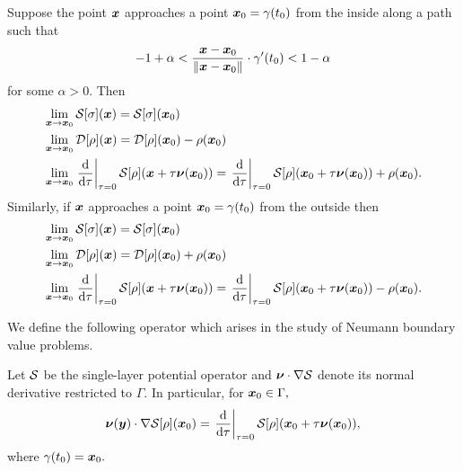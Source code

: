 \begin{theorem}\label{thm:potlim}
Suppose the point $\boldsymbol{x}$ approaches a point $\boldsymbol{x}_0 = \gamma(t_0)$ from the inside along a path such that 
\begin{align}
-1+\alpha<\frac{\boldsymbol{x}-\boldsymbol{x}_0}{\|\boldsymbol{x}-\boldsymbol{x}_0\|} \cdot \gamma'(t_0) <1-\alpha
\end{align}
for some $\alpha >0.$ Then 
\begin{align}
&\lim_{\boldsymbol{x} \to \boldsymbol{x}_0} \mathcal{S}[\sigma](\boldsymbol{x}) = \mathcal{S}[\sigma](\boldsymbol{x}_0)\\
&\lim_{\boldsymbol{x} \to \boldsymbol{x}_0} \mathcal{D}[\rho](\boldsymbol{x}) = \mathcal{D}[\rho](\boldsymbol{x}_0)- \rho(\boldsymbol{x}_0)\\
&\lim_{\boldsymbol{x} \to \boldsymbol{x}_0} \left.\frac{{\rm d}}{{\rm d}\tau}\right|_{\tau= 0}\mathcal{S}[\rho](\boldsymbol{x}+\tau \boldsymbol{\nu}(\boldsymbol{x}_0)) = \left.\frac{{\rm d}}{{\rm d}\tau}\right|_{\tau= 0}\mathcal{S}[\rho](\boldsymbol{x}_0+\tau \boldsymbol{\nu}(\boldsymbol{x}_0))+ \rho(\boldsymbol{x}_0).
\end{align}
Similarly, if $\boldsymbol{x}$ approaches a point $\boldsymbol{x}_0 = \gamma(t_0)$ from the outside then
\begin{align}
&\lim_{\boldsymbol{x} \to \boldsymbol{x}_0} \mathcal{S}[\sigma](\boldsymbol{x}) = \mathcal{S}[\sigma](\boldsymbol{x}_0)\\
&\lim_{\boldsymbol{x} \to \boldsymbol{x}_0} \mathcal{D}[\rho](\boldsymbol{x}) = \mathcal{D}[\rho](\boldsymbol{x}_0)+ \rho(\boldsymbol{x}_0)\\
&\lim_{\boldsymbol{x} \to \boldsymbol{x}_0} \left.\frac{{\rm d}}{{\rm d}\tau}\right|_{\tau= 0}\mathcal{S}[\rho](\boldsymbol{x}+\tau \boldsymbol{\nu}(\boldsymbol{x}_0)) = \left.\frac{{\rm d}}{{\rm d}\tau}\right|_{\tau= 0}\mathcal{S}[\rho](\boldsymbol{x}_0+\tau \boldsymbol{\nu}(\boldsymbol{x}_0))- \rho(\boldsymbol{x}_0).
\end{align}
\end{theorem}

We define the following operator which arises in the study of Neumann boundary value problems.
\begin{definition}\label{def_singder}
Let $\mathcal{S}$ be the single-layer potential operator and $\boldsymbol{\nu}\cdot \nabla \mathcal{S}$  denote its normal derivative restricted to $\Gamma.$ In particular, for $\boldsymbol{x}_0 \in \Gamma,$
\begin{align}
\boldsymbol{\nu}(\boldsymbol{y})\cdot \nabla \mathcal{S}[\rho] (\boldsymbol{x}_0) = \left.\frac{{\rm d}}{{\rm d}\tau}\right|_{\tau = 0} \mathcal{S}[\rho](\boldsymbol{x}_0 + \tau \boldsymbol{\nu}(\boldsymbol{x}_0)),
\end{align}
where $\gamma(t_0) = \boldsymbol{x}_0.$
\end{definition}

